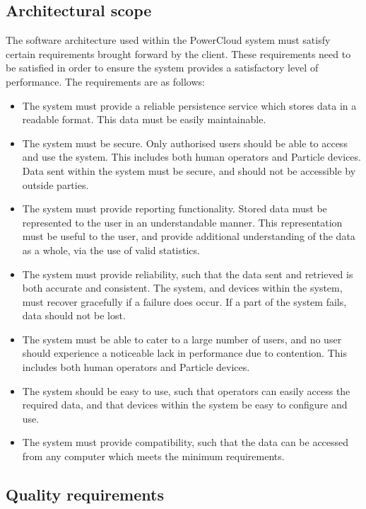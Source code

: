 \documentclass{article}
\begin{document}
	\subsection{Architectural scope}
	
	The software architecture used within the PowerCloud system must 
	satisfy certain requirements brought forward by the client. These 
	requirements need to be satisfied in order to ensure the system 
	provides a satisfactory level of performance. The requirements are as 
	follows:

	\begin{itemize}
		\item The system must provide a reliable persistence service 
		which stores data in a readable format. This data must be easily 
		maintainable.
		\item The system must be secure. Only authorised users should be 
		able to access and use the system. This includes both human 
		operators and Particle devices. Data sent within the system must 
		be secure, and should not be accessible by outside parties.
		\item The system must provide reporting functionality. Stored 
		data must be represented to the user in an understandable manner. 
		This representation must be useful to the user, and provide 
		additional understanding of the data as a whole, via the use of 
		valid statistics.
		\item The system must provide reliability, such that the data 
		sent and retrieved is both accurate and consistent. The system, 
		and devices within the system, must recover gracefully if a 
		failure does occur. If a part of the system fails, data should 
		not be lost.
		\item The system must be able to cater to a large number of 
		users, and no user should experience a noticeable lack in 
		performance due to contention. This includes both human operators 
		and Particle devices.
		\item The system should be easy to use, such that operators can 
		easily access the required data, and that devices within the 
		system be easy to configure and use.
		\item The system must provide compatibility, such that the data 
		can be accessed from any computer which meets the minimum 
		requirements.
	\end{itemize}
	
	\newpage

	\subsection{Quality requirements}
	
\end{document}

